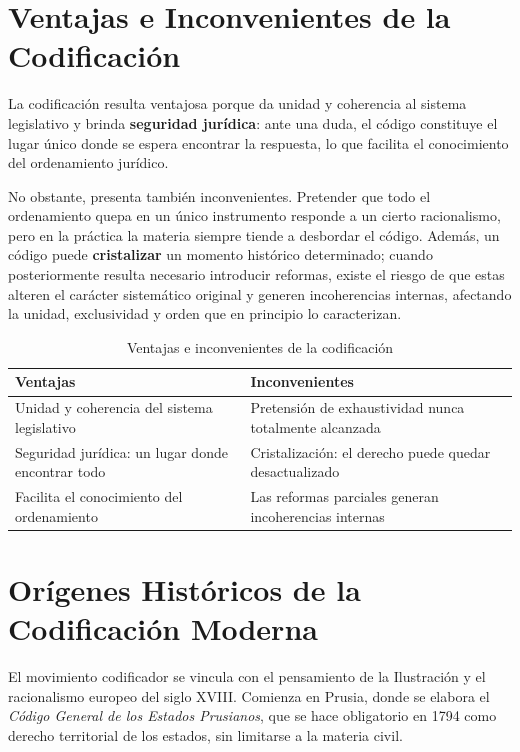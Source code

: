 \documentclass[12pt,oneside]{book}
\begin{document}
\section{Ventajas e Inconvenientes de la Codificación}

La codificación resulta ventajosa porque da unidad y coherencia al sistema legislativo y brinda \textbf{seguridad jurídica}: ante una duda, el código constituye el lugar único donde se espera encontrar la respuesta, lo que facilita el conocimiento del ordenamiento jurídico.

No obstante, presenta también inconvenientes. Pretender que todo el ordenamiento quepa en un único instrumento responde a un cierto racionalismo, pero en la práctica la materia siempre tiende a desbordar el código. Además, un código puede \textbf{cristalizar} un momento histórico determinado; cuando posteriormente resulta necesario introducir reformas, existe el riesgo de que estas alteren el carácter sistemático original y generen incoherencias internas, afectando la unidad, exclusividad y orden que en principio lo caracterizan.

\begin{table}[H]
\centering
\begin{tabular}{@{}p{}p{}@{}}
\toprule
\textbf{Ventajas} & \textbf{Inconvenientes} \\
\midrule
Unidad y coherencia del sistema legislativo & Pretensión de exhaustividad nunca totalmente alcanzada \\
Seguridad jurídica: un lugar donde encontrar todo & Cristalización: el derecho puede quedar desactualizado \\
Facilita el conocimiento del ordenamiento & Las reformas parciales generan incoherencias internas \\
\bottomrule
\end{tabular}
\caption{Ventajas e inconvenientes de la codificación}
\end{table}

\section{Orígenes Históricos de la Codificación Moderna}

El movimiento codificador se vincula con el pensamiento de la Ilustración y el racionalismo europeo del siglo XVIII. Comienza en Prusia, donde se elabora el \textit{Código General de los Estados Prusianos}, que se hace obligatorio en 1794 como derecho territorial de los estados, sin limitarse a la materia civil.
\end{document}
